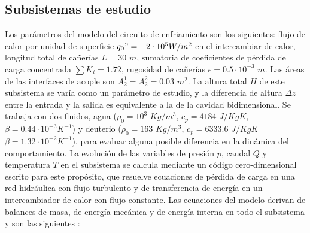 \subsection*{Subsistemas de estudio}
Los parámetros del modelo del circuito de enfriamiento son los siguientes:
flujo de calor por unidad de superficie $q_0"=-2\cdot 10^5 W/m^2$ en el intercambiar de calor,
longitud total de cañerías $L=30$ $m$, 
sumatoria de coeficientes de pérdida de carga concentrada $\sum K_i=1.72$, 
rugosidad de cañerías $\epsilon=0.5\cdot 10^{-3}$ $m$.
Las áreas de las interfaces de acople son $A_2^1=A_2^2=0.03$ $m^2$.
La altura total $H$ de este subsistema se varía como un parámetro de estudio,
y la diferencia de altura $\Delta z$ entre la entrada y la salida es equivalente a la de la cavidad bidimensional.
Se trabaja con dos fluidos, agua ($\rho_0=10^3$ $Kg/m^3$, $c_p=4184$ $J/KgK$, $\beta = 0.44\cdot10^{-3}K^{-1}$) y deuterio ($\rho_0=163$ $Kg/m^3$, $c_p=6333.6$ $J/KgK$ $\beta = 1.32\cdot10^{-2}K^{-1}$),
para evaluar alguna posible diferencia en la dinámica del comportamiento.
La evolución de las variables de presión $p$, caudal $Q$ y temperatura $T$ en el subsistema se calcula mediante un código cero-dimensional escrito para este propósito,
que resuelve ecuaciones de pérdida de carga en una red hidráulica con flujo turbulento 
y de transferencia de energía en un intercambiador de calor con flujo constante.
Las ecuaciones del modelo derivan de balances de masa, de energía mecánica y de energía interna en todo el subsistema y son las siguientes \cite{iedelchik} \cite{kays}:

